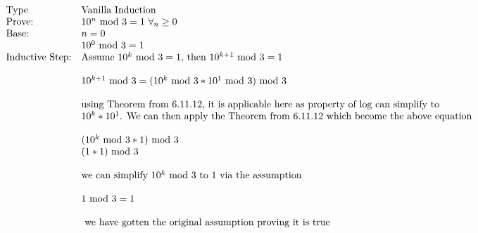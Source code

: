 \documentclass[letterpaper]{article}
\begin{document}
	\section{}
    	\begin{displaymath}
            \begin{array}{llll}
            $Type$ & $Vanilla Induction$ &&\\
            $Prove:$ & 10^n$ mod $3=1 $ $ \forall_n \geq 0 &&\\
            $Base:$ & n=0 &&\\
            & 10^0 $ mod $ 3 = 1 &&\\
            $Inductive Step:$ & $Assume $ 10^k $ mod $ 3 = 1, $ then $ 10^{k+1} $ mod $ 3 = 1 &&\\
            \\
            & 10^{k+1} $ mod $ 3 = (10^k $ mod $ 3 * 10^1 $ mod $ 3) $ mod $ 3 && \\
            \\
            & $using Theorem from 6.11.12, it is applicable here as property of log can simplify to$&&\\
            & 10^k * 10^1 $. We can then apply the Theorem from 6.11.12 which become the above equation$&&\\
            \\
            & (10^k $ mod $ 3 * 1) $ mod $ 3 && \\
            & (1 * 1) $ mod $ 3 && \\
            \\
            & $we can simplify $ 10^k $ mod $ 3 $ to 1 via the assumption$ &&\\
            \\
            & 1 $ mod $ 3 = 1 &&\\
            \\
            & $ we have gotten the original assumption proving it is true$ && \\
            \end{array}
        \end{displaymath}
\end{document}
